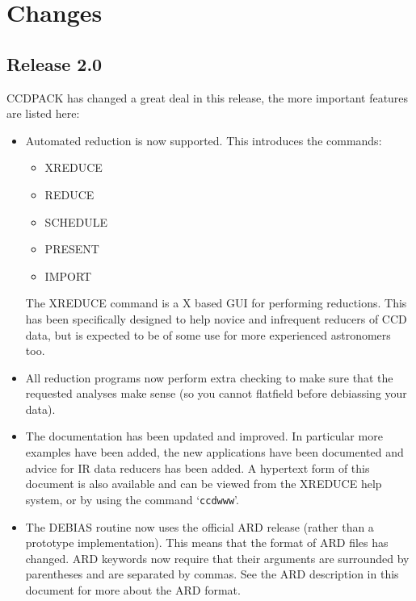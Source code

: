 \documentclass[twoside,11pt]{article}
\newcommand{\htmlref}[2]{#1}
\newcommand{\xref}[3]{#1}
\renewcommand{\_}{\texttt{\symbol{95}}}
\newcommand{\text}[1]{{\small \tt #1}}
\newcommand{\xroutine}[1]{\htmlref{{\sc #1}}{#1}}
\begin{document}
\newpage
\section{Changes}
\subsection{Release 2.0}

CCDPACK has changed a great deal in this release, the more important
features are listed here:
\begin{itemize}
   \item Automated reduction is now supported. This introduces the commands:
      \begin{itemize}
         \item \xroutine{XREDUCE}
         \item \xroutine{REDUCE}
         \item \xroutine{SCHEDULE}
         \item \xroutine{PRESENT}
        \item \xroutine{IMPORT}
      \end{itemize}
      The \xroutine{XREDUCE} command is a X based GUI for performing
      reductions.  This has been specifically designed to help novice
      and infrequent reducers of CCD data, but is expected to be of
      some use for more experienced astronomers too.

  \item All reduction programs now perform extra checking to make sure
        that the requested analyses make sense (so you cannot flatfield
        before debiassing your data).

  \item The documentation has been updated and improved. In particular
        more examples have been added, the new applications have been
        documented and advice for IR data reducers has been added.
        A hypertext form of this document is also available and can be
        viewed from the \xroutine{XREDUCE} help system, or by using the
        command `\text{ccdwww}'.

  \item The \xroutine{DEBIAS} routine now uses the official
        \xref{ARD}{sun183}{} release (rather than a prototype
        implementation). This means that the format of ARD files has
        changed. ARD keywords now require that their arguments are
        surrounded by parentheses and are separated by commas. See the
        ARD description in this document for more about the ARD format.
\end{itemize}
\end{document}
